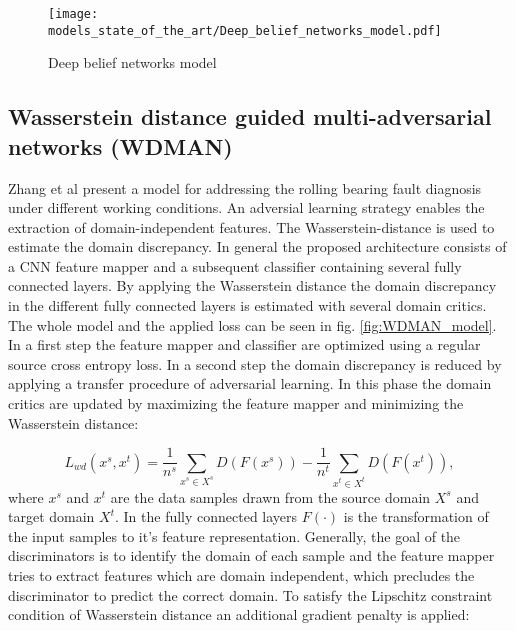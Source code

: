 {\begin{figure}[H]
  \centering
  \texttt{[image: models\_state\_of\_the\_art/Deep\_belief\_networks\_model.pdf]}
  \caption{Deep belief networks model \cite{Zhang2017}}
  \label{fig:Deep_belief_networks_model}
\end{figure}


\subsection{Wasserstein distance guided multi-adversarial networks (WDMAN)}
 Zhang et al \cite{Zhang2019} present a model for addressing the rolling bearing fault diagnosis under different working conditions. An adversial learning strategy enables the extraction of domain-independent features. The Wasserstein-distance is used to estimate the domain discrepancy. In general the proposed architecture consists of a CNN feature mapper and a subsequent classifier containing several fully connected layers. By applying the Wasserstein distance the domain discrepancy in the different fully connected layers is estimated with several domain critics. The whole model and the applied loss can be seen in fig. \ref{fig:WDMAN_model}. In a first step the feature mapper and classifier are optimized using a regular source cross entropy loss. In a second step the domain discrepancy is reduced by applying a transfer procedure of adversarial learning. In this phase the domain critics are updated by maximizing the feature mapper and minimizing the Wasserstein distance: 
 
 \begin{equation}
     L_{wd}(x^{s}, x^{t}) = \frac{1}{n^{s}} \sum_{x^{s} \in X^{s}} D(F(x^{s})) - \frac{1}{n^{t}} \sum_{x^{t} \in X^{t}} D(F(x^{t})),
 \end{equation}
 where $x^{s}$ and $x^{t}$ are the data samples drawn from the source domain $X^{s}$ and target domain $X^{t}$. In the fully connected layers $F(\cdot)$ is the transformation of the input samples to it's feature representation. Generally, the goal of the discriminators is to identify the domain of each sample and the feature mapper tries to extract features which are domain independent, which precludes the discriminator to predict the correct domain. To satisfy the Lipschitz constraint condition of Wasserstein distance an additional gradient penalty is applied: 

}
